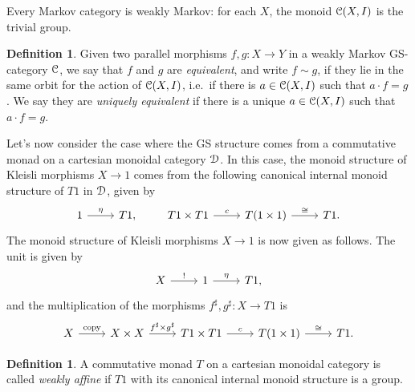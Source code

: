 \documentclass[a4paper,UKenglish,numberwithinsect,cleveref, autoref, thm-restate]{lipics-v2021}
\theoremstyle{plain} %
\theoremstyle{definition} %
\newtheorem{mydefinition}[mytheorem]{Definition}
\begin{document}
Every Markov category is weakly Markov: for each $X$, the monoid $\mathcal{C}(X,I)$ is the trivial group.

\begin{mydefinition}
 Given two parallel morphisms $f,g:X\to Y$ in a weakly Markov GS-category $\mathcal{C}$, we say that $f$ and $g$ are \emph{equivalent}, and write $f\sim g$, if they lie in the same orbit for the action of $\mathcal{C}(X,I)$, i.e.~if there is $a\in \mathcal{C}(X,I)$ such that $a\cdot f=g$.
 We say they are \emph{uniquely equivalent} if there is a unique $a\in \mathcal{C}(X,I)$ such that $a\cdot f=g$.
\end{mydefinition}


Let's now consider the case where the GS structure comes from a commutative monad on a cartesian monoidal category $\mathcal{D}$. 
In this case, the monoid structure of Kleisli morphisms $X\to 1$ comes from the following canonical internal monoid structure of $T1$ in $\mathcal{D}$, given by 
 \[
 \begin{tikzcd}
  1 \ar{r}{\eta} & T1 ,
 \end{tikzcd}
 \qquad
 \begin{tikzcd}
  T1 \times T1 \ar{r}{c} & T(1\times 1) \ar{r}{\cong} & T1 .
 \end{tikzcd}
 \]
 The monoid structure of Kleisli morphisms $X\to 1$ is now given as follows. The unit is given by
 \[
 \begin{tikzcd}
  X \ar{r}{!} & 1 \ar{r}{\eta} & T1 ,
 \end{tikzcd}
 \]
 and the multiplication of the morphisms $f^\sharp,g^\sharp:X\to T1$ is
 \[
 \begin{tikzcd}
  X \ar{r}{\mathrm{copy}} & X\times X \ar{r}{f^\sharp\times g^\sharp} &
  T1 \times T1 \ar{r}{c} & T(1\times 1) \ar{r}{\cong} & T1 .
 \end{tikzcd}
 \]




\begin{mydefinition}
 A commutative monad $T$ on a cartesian monoidal category is called \emph{weakly affine} if $T1$ with its canonical internal monoid structure is a group.
\end{mydefinition}
\end{document}
